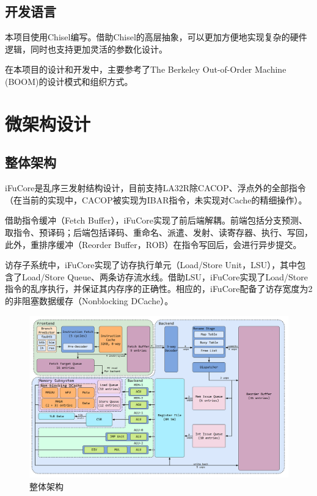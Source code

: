 \documentclass{article}
\begin{document}
\subsection{开发语言}
本项目使用Chisel编写。借助Chisel的高层抽象，可以更加方便地实现复杂的硬件逻辑，同时也支持更加灵活的参数化设计。\par
在本项目的设计和开发中，主要参考了The Berkeley Out-of-Order Machine (BOOM)的设计模式和组织方式。\par

\section{微架构设计}
\subsection{整体架构}
iFuCore是乱序三发射结构设计，目前支持LA32R除CACOP、浮点外的全部指令（在当前的实现中，CACOP被实现为IBAR指令，未实现对Cache的精细操作）。\par
借助指令缓冲（Fetch Buffer），iFuCore实现了前后端解耦。前端包括分支预测、取指令、预译码；后端包括译码、重命名、派遣、发射、读寄存器、执行、写回，此外，重排序缓冲（Reorder Buffer，ROB）在指令写回后，会进行异步提交。\par
访存子系统中，iFuCore实现了访存执行单元（Load/Store Unit，LSU），其中包含了Load/Store Queue、两条访存流水线。借助LSU，iFuCore实现了Load/Store指令的乱序执行，并保证其内存序的正确性。相应的，iFuCore配备了访存宽度为2的非阻塞数据缓存（Nonblocking DCache）。\par
\begin{figure}[h]
    \centering
    \includegraphics[width=\linewidth]{./imgs/Core.png}
    \caption{整体架构}
\end{figure}
\end{document}

